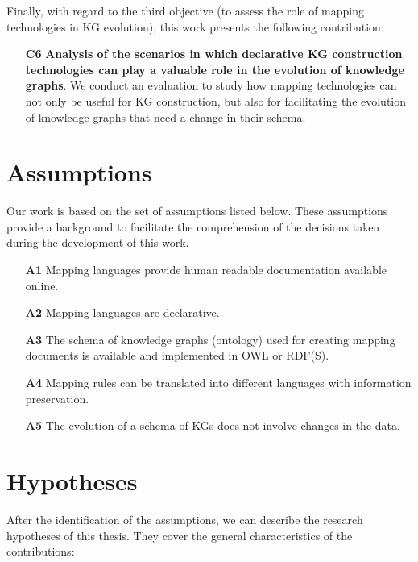 Finally, with regard to the third objective (to assess the role of mapping technologies in KG evolution), this work presents the following contribution:

\begin{enumerate}
    \item[\textbf{C6}]\textbf{Analysis of the scenarios in which declarative KG construction technologies can play a valuable role in the evolution of knowledge graphs}. We conduct an evaluation to study how mapping technologies can not only be useful for KG construction, but also for facilitating the evolution of knowledge graphs that need a change in their schema. 
\end{enumerate}


\section{Assumptions}
\label{sec:chp3-assumptions}
Our work is based on the set of assumptions listed below. These assumptions provide a background to facilitate the comprehension of the decisions taken during the development of this work. 


\begin{enumerate}
    \item[\textbf{A1}] Mapping languages provide human readable documentation available online.
    \item[\textbf{A2}] Mapping languages are declarative.
    \item[\textbf{A3}] The schema of knowledge graphs (ontology) used for creating mapping documents is available and implemented in OWL or RDF(S). 
    \item[\textbf{A4}] Mapping rules can be translated into different languages with information preservation. 
    \item[\textbf{A5}] The evolution of a schema of KGs does not involve changes in the data.
\end{enumerate}


\section{Hypotheses}
\label{sec:chp3-hypotheses}

After the identification of the assumptions, we can describe the research hypotheses  of this thesis. They cover the general characteristics of the contributions:

